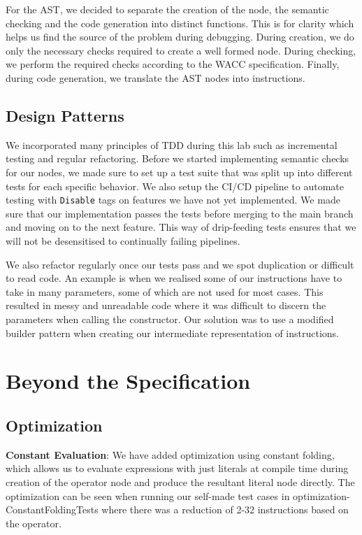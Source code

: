 \documentclass[11pt,a4paper]{article}
\newcommand{\cmd}[1]{\texttt{#1}}
\begin{document}
For the AST, we decided to separate the creation of the node, the semantic checking and the code generation into distinct functions. This is for clarity which helps us find the source of the problem during debugging. During creation, we do only the necessary checks required to create a well formed node. During checking, we perform the required checks according to the WACC specification. Finally, during code generation, we translate the AST nodes into instructions. 


\subsection{Design Patterns}
We incorporated many principles of TDD during this lab such as incremental testing and regular refactoring. Before we started implementing semantic checks for our nodes, we made sure to set up a test suite that was split up into different tests for each specific behavior. We also setup the CI/CD pipeline to automate testing with \cmd{Disable} tags on features we have not yet implemented. We made sure that our implementation passes the tests before merging to the main branch and moving on to the next feature. This way of drip-feeding tests ensures that we will not be desensitised to continually failing pipelines.

We also refactor regularly once our tests pass and we spot duplication or difficult to read code. An example is when we realised some of our instructions have to take in many parameters, some of which are not used for most cases. This resulted in messy and unreadable code where it was difficult to discern the parameters when calling the constructor. Our solution was to use a modified builder pattern when creating our intermediate representation of instructions.

\section{Beyond the Specification}

\subsection{Optimization}
\textbf{Constant Evaluation}: We have added optimization using constant folding, which allows us to evaluate expressions with just literals at compile time during creation of the operator node and produce the resultant literal node directly. The optimization can be seen when running our self-made test cases in optimization- ConstantFoldingTests where there was a reduction of 2-32 instructions based on the operator. 
\end{document}
